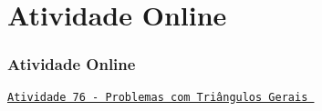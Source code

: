 
\section{Atividade Online}
\begin{frame}
\frametitle{Atividade Online} 

\href{https://pt.khanacademy.org/math/trigonometry/trig-with-general-triangles/solving-general-triangles/e/law-of-sines-and-cosines-word-problems}
{{\tt Atividade 76 - Problemas com Triângulos Gerais }}




\end{frame}


